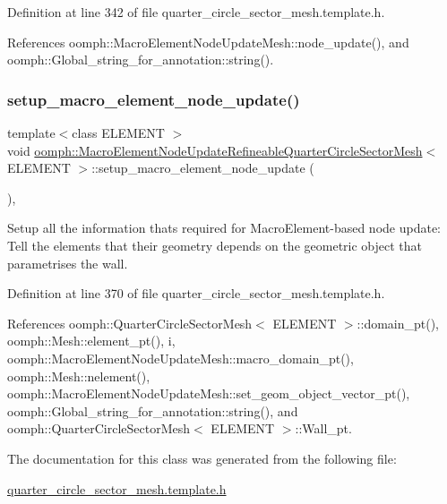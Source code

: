 Definition at line 342 of file quarter\+\_\+circle\+\_\+sector\+\_\+mesh.\+template.\+h.



References oomph\+::\+Macro\+Element\+Node\+Update\+Mesh\+::node\+\_\+update(), and oomph\+::\+Global\+\_\+string\+\_\+for\+\_\+annotation\+::string().

\mbox{\label{classoomph_1_1MacroElementNodeUpdateRefineableQuarterCircleSectorMesh_a94b5efa53ac7689757dad989098df7ed}} 
\subsubsection{\texorpdfstring{setup\+\_\+macro\+\_\+element\+\_\+node\+\_\+update()}{setup\_macro\_element\_node\_update()}}
{\footnotesize\ttfamily template$<$class E\+L\+E\+M\+E\+NT $>$ \\
void \hyperlink{classoomph_1_1MacroElementNodeUpdateRefineableQuarterCircleSectorMesh}{oomph\+::\+Macro\+Element\+Node\+Update\+Refineable\+Quarter\+Circle\+Sector\+Mesh}$<$ E\+L\+E\+M\+E\+NT $>$\+::setup\+\_\+macro\+\_\+element\+\_\+node\+\_\+update (\begin{DoxyParamCaption}{ }\end{DoxyParamCaption})\hspace{0.3cm}{\ttfamily [inline]}, {\ttfamily [private]}}



Setup all the information that\textquotesingle{}s required for Macro\+Element-\/based node update\+: Tell the elements that their geometry depends on the geometric object that parametrises the wall. 



Definition at line 370 of file quarter\+\_\+circle\+\_\+sector\+\_\+mesh.\+template.\+h.



References oomph\+::\+Quarter\+Circle\+Sector\+Mesh$<$ E\+L\+E\+M\+E\+N\+T $>$\+::domain\+\_\+pt(), oomph\+::\+Mesh\+::element\+\_\+pt(), i, oomph\+::\+Macro\+Element\+Node\+Update\+Mesh\+::macro\+\_\+domain\+\_\+pt(), oomph\+::\+Mesh\+::nelement(), oomph\+::\+Macro\+Element\+Node\+Update\+Mesh\+::set\+\_\+geom\+\_\+object\+\_\+vector\+\_\+pt(), oomph\+::\+Global\+\_\+string\+\_\+for\+\_\+annotation\+::string(), and oomph\+::\+Quarter\+Circle\+Sector\+Mesh$<$ E\+L\+E\+M\+E\+N\+T $>$\+::\+Wall\+\_\+pt.



The documentation for this class was generated from the following file\+:\begin{DoxyCompactItemize}
\item 
\hyperlink{quarter__circle__sector__mesh_8template_8h}{quarter\+\_\+circle\+\_\+sector\+\_\+mesh.\+template.\+h}\end{DoxyCompactItemize}
